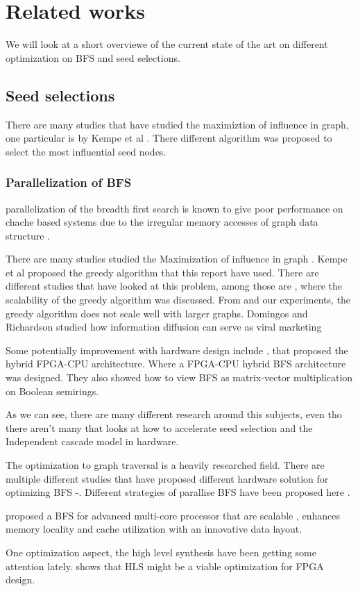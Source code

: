 \chapter{Related works} \label{relatedWork}
We will look at a short overviewe of the current state of the art on different optimization on BFS and seed selections.

\section{Seed selections}
There are many studies that have studied the maximiztion of influence in graph, one particular is by Kempe et al \cite{MaximizeSpread2003}. There different algorithm was proposed to select the most influential seed nodes. 

\subsection{Parallelization of BFS}
parallelization of the breadth first search is known to give poor performance on chache based systems due to the irregular memory accesses of graph data structure \cite{xia2009topologically}.




There are many studies studied the Maximization of influence in graph \cite{MaximizeSpread2003}.  Kempe et al proposed the greedy algorithm that this report have used. There are different studies that have looked at this problem, among those are \cite{InfluenceMax}, where the scalability of the greedy algorithm was discussed. From \cite{InfluenceMax} and our experiments, the greedy algorithm does not scale well with larger graphs. Domingos and Richardson studied how information diffusion can serve as viral marketing \cite{ViralMarketing}

Some potentially improvement with hardware design include \cite{HybridBFS2015}, that proposed the hybrid FPGA-CPU architecture. Where a FPGA-CPU hybrid BFS architecture was designed. They also showed how to view BFS as matrix-vector multiplication on Boolean semirings. 

As we can see, there are many different research around this subjects, even tho there aren't many that looks at how to accelerate seed selection and the Independent cascade model in hardware.

The optimization to graph traversal is a heavily researched field. There are multiple different studies that have proposed different hardware solution for optimizing BFS \cite{ScalableGraphEx}-\cite{DirectOptimizeBFS}. Different strategies of parallise BFS have been proposed here \cite{ParallelBFS2011}. 

\cite{ScalableGraphEx} proposed a BFS for advanced multi-core processor that are scalable , enhances memory locality and cache utilization with an innovative data layout.

One optimization aspect, the high level synthesis have been getting some attention lately. \cite{HLSready2015} shows that HLS might be a viable optimization for FPGA design. 

